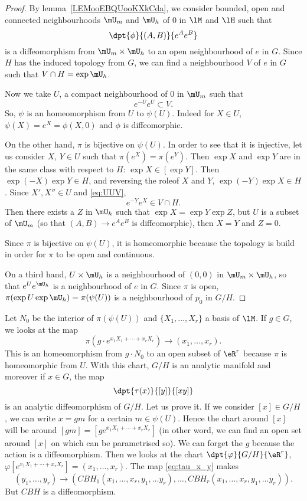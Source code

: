 \begin{proof}
	By lemma~\ref{LEMooEBQUooKXkCda}, we consider bounded, open and connected neighbourhoods $\mU_m$ and $\mU_h$ of $0$ in $\lM$ and $\lH$ such that
	\[
		\dpt{\phi}{(A,B)}{e^Ae^B}
	\]
	is a diffeomorphism from $\mU_m\times\mU_h$ to an open neighbourhood of $e$ in $G$. Since $H$ has the induced topology from $G$, we can find a neighbourhood $V$ of $e$ in $G$ such that $V\cap H=\exp\mU_h$.

	Now we take $U$, a compact neighbourhood of $0$ in $\mU_m$ such that
	\begin{equation}\label{eq:UUV}
		e^{-U}e^{U}\subset V.
	\end{equation}
	So, $\psi$ is an homeomorphism from $U$ to $\psi(U)$. Indeed for $X\in U$, $\psi(X)=e^X=\phi(X,0)$ and $\phi$ is diffeomorphic.

	On the other hand, $\pi$ is bijective on $\psi(U)$. In order to see that it is injective, let us consider $X$, $Y\in U$ such that $\pi(e^{X})=\pi(e^{Y})$. Then $\exp X$ and $\exp Y$ are in the same class with respect to $H$: $\exp X\in[\exp Y]$. Then $\exp(-X)\exp Y\in H$, and reversing the role\angl of $X$ and $Y$, $\exp(-Y)\exp X\in H$. Since $X',X''\in U$ and \eqref{eq:UUV},
	\[
		e^{-Y}e^{X}\in V\cap H.
	\]
	Then there exists a $Z$ in $\mU_h$ such that $\exp X=\exp Y\exp Z$, but $U$ is a subset of $\mU_m$ (so that $(A,B)\to e^Ae^B$ is diffeomorphic), then $X=Y$ and $Z=0$.

	Since $\pi$ is bijective on $\psi(U)$, it is homeomorphic because the topology is build in order for $\pi$ to be open and continuous.

	On a third hand, $U\times\mU_h$ is a neighbourhood of $(0,0)$ in $\mU_m\times\mU_h$, so that $e^Ue^{\mU_h}$ is a neighbourhood of $e$ in $G$. Since $\pi$ is open, $\pi(\exp U\exp \mU_h)=\pi(\psi(U))$ is a neighbourhood of $p_0$ in $G/H$.
\end{proof}


Let $N_0$ be the interior of $\pi(\psi(U))$ and $\{X_1,\ldots, X_r\}$ a basis of $\lM$. If $g\in G$, we looks at the map
\[
	\pi(g\cdot e^{x_1X_1+\cdots+x_rX_r})\to(x_1,\ldots,x_r).
\]
This is an homeomorphism from $g\cdot N_0$ to an open subset of $\eR^r$ because $\pi$ is homeomorphic from $U$. With this chart, $G/H$ is an analytic manifold  and moreover if $x\in G$, the map
\begin{equation}\label{eq:tau_x_y}
	\dpt{\tau(x)}{[y]}{[xy]}
\end{equation}
is an analytic diffeomorphism of $G/H$. Let us prove it. If we consider $[x]\in G/H$, we can write $x=gm$ for a certain $m\in\psi(U)$. Hence the chart around $[x]$ will be around $[gm]=[ge^{x_1X_1+\cdots+x_rX_r}]$ (in other word, we can find an open set around $[x]$ on which can be parametrised so). We can forget the $g$ because the action is a diffeomorphism. Then we looks at the chart $\dpt{\varphi}{G/H}{\eR^r}$, $\varphi[e^{x_1X_1+\cdots+x_rX_r}]=(x_1,\ldots,x_r)$. The map \eqref{eq:tau_x_y} makes
\begin{equation}
	(y_1,\ldots,y_r)\to( CBH_1(x_1,\ldots,x_r,y_1,\ldots y_r),\ldots, CBH_r(x_1,\ldots,x_r,y_1,\ldots y_r)).
\end{equation}
But $CBH$ is a diffeomorphism.

